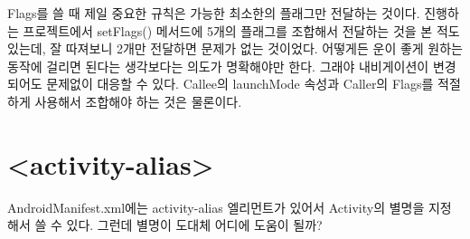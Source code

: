 Flags를 쓸 때 제일 중요한 규칙은 가능한 최소한의 플래그만 전달하는 것이다.
진행하는 프로젝트에서 setFlags() 메서드에 5개의 플래그를 조합해서 전달하는 것을 본 적도 있는데, 잘 따져보니 2개만 전달하면 문제가 없는 것이었다.
어떻게든 운이 좋게 원하는 동작에 걸리면 된다는 생각보다는 의도가 명확해야만 한다. 그래야 내비게이션이 변경되어도 문제없이 대응할 수 있다. Callee의 launchMode 속성과 Caller의 Flags를 적절하게 사용해서 조합해야 하는 것은 물론이다. 

\section{<activity-alias>}\label{sec:alias}
AndroidManifest.xml에는 activity-alias 엘리먼트가 있어서 Activity의 별명을 지정해서 쓸 수 있다. 그런데 별명이 도대체 어디에 도움이 될까?

